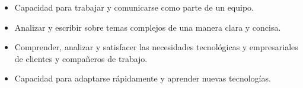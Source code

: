 \documentclass[9pt]{developercv}
\begin{document}
	\begin{minipage}{0.6\textwidth}	
		\begin{itemize}[noitemsep,nolistsep,leftmargin=*]
			\item Capacidad para trabajar y comunicarse como parte de un equipo.
			\item Analizar y escribir sobre temas complejos de una manera clara y concisa.
			\item Comprender, analizar y satisfacer las necesidades tecnológicas y empresariales de clientes y compañeros de trabajo.
			\item Capacidad para adaptarse rápidamente y aprender nuevas tecnologías.
		\end{itemize}	
	\end{minipage}
	\begin{minipage}{0.4\textwidth}
		\begin{barchart}{5.5}
		\end{barchart}
	\end{minipage}
	\vspace{-\baselineskip}
\end{document}

